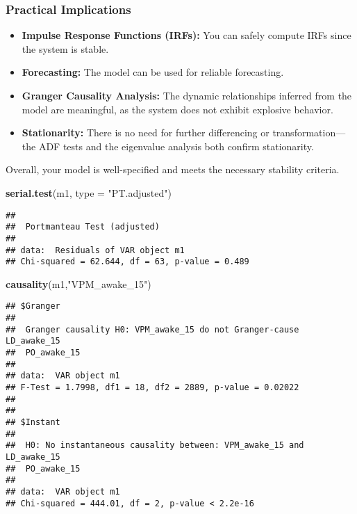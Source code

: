 \documentclass[
]{article}
\newenvironment{Shaded}{\begin{snugshade}}{\end{snugshade}}
\newcommand{\AttributeTok}[1]{\textcolor[rgb]{0.13,0.29,0.53}{#1}}
\newcommand{\FunctionTok}[1]{\textcolor[rgb]{0.13,0.29,0.53}{\textbf{#1}}}
\newcommand{\NormalTok}[1]{#1}
\newcommand{\StringTok}[1]{\textcolor[rgb]{0.31,0.60,0.02}{#1}}
\providecommand{\tightlist}{%
  \setlength{\itemsep}{0pt}\setlength{\parskip}{0pt}}
\begin{document}
\hypertarget{practical-implications}{%
\subsubsection{Practical Implications}\label{practical-implications}}

\begin{itemize}
\tightlist
\item
  \textbf{Impulse Response Functions (IRFs):} You can safely compute
  IRFs since the system is stable.
\item
  \textbf{Forecasting:} The model can be used for reliable forecasting.
\item
  \textbf{Granger Causality Analysis:} The dynamic relationships
  inferred from the model are meaningful, as the system does not exhibit
  explosive behavior.
\item
  \textbf{Stationarity:} There is no need for further differencing or
  transformation---the ADF tests and the eigenvalue analysis both
  confirm stationarity.
\end{itemize}

Overall, your model is well-specified and meets the necessary stability
criteria.

\begin{Shaded}
\begin{Highlighting}[]
\FunctionTok{serial.test}\NormalTok{(m1, }\AttributeTok{type =} \StringTok{"PT.adjusted"}\NormalTok{)}
\end{Highlighting}
\end{Shaded}

\begin{verbatim}
## 
##  Portmanteau Test (adjusted)
## 
## data:  Residuals of VAR object m1
## Chi-squared = 62.644, df = 63, p-value = 0.489
\end{verbatim}

\begin{Shaded}
\begin{Highlighting}[]
\FunctionTok{causality}\NormalTok{(m1,}\StringTok{"VPM\_awake\_15"}\NormalTok{)}
\end{Highlighting}
\end{Shaded}

\begin{verbatim}
## $Granger
## 
##  Granger causality H0: VPM_awake_15 do not Granger-cause LD_awake_15
##  PO_awake_15
## 
## data:  VAR object m1
## F-Test = 1.7998, df1 = 18, df2 = 2889, p-value = 0.02022
## 
## 
## $Instant
## 
##  H0: No instantaneous causality between: VPM_awake_15 and LD_awake_15
##  PO_awake_15
## 
## data:  VAR object m1
## Chi-squared = 444.01, df = 2, p-value < 2.2e-16
\end{verbatim}
\end{document}
